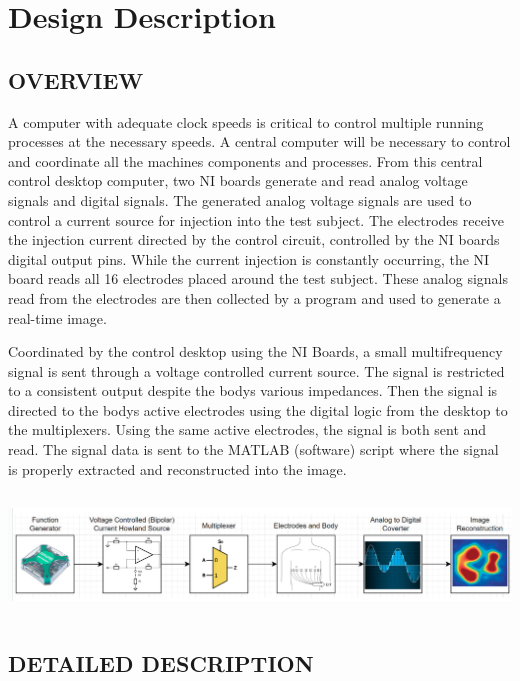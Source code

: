 \documentclass[12pt]{article}
\begin{document}
\section{Design Description}\label{design-description}

\subsection{OVERVIEW}\label{overview}

A computer with adequate clock speeds is critical to control multiple
running processes at the necessary speeds. A central computer will be
necessary to control and coordinate all the machine\textquotesingle s
components and processes. From this central control desktop computer,
two NI boards generate and read analog voltage signals and digital
signals. The generated analog voltage signals are used to control a
current source for injection into the test subject. The electrodes
receive the injection current directed by the control circuit,
controlled by the NI boards\textquotesingle{} digital output pins. While
the current injection is constantly occurring, the NI board reads all 16
electrodes placed around the test subject. These analog signals read
from the electrodes are then collected by a program and used to generate
a real-time image.

Coordinated by the control desktop using the NI Boards, a small
multifrequency signal is sent through a voltage controlled current
source. The signal is restricted to a consistent output despite the
body\textquotesingle s various impedances. Then the signal is directed
to the body\textquotesingle s active electrodes using the digital logic
from the desktop to the multiplexers. Using the same active electrodes,
the signal is both sent and read. The signal data is sent to the MATLAB
(software) script where the signal is properly extracted and
reconstructed into the image.

\includegraphics[width=6.83087in,height=1.26656in]{media/image4.png}

\subsection{DETAILED DESCRIPTION}\label{detailed-description}
\end{document}

